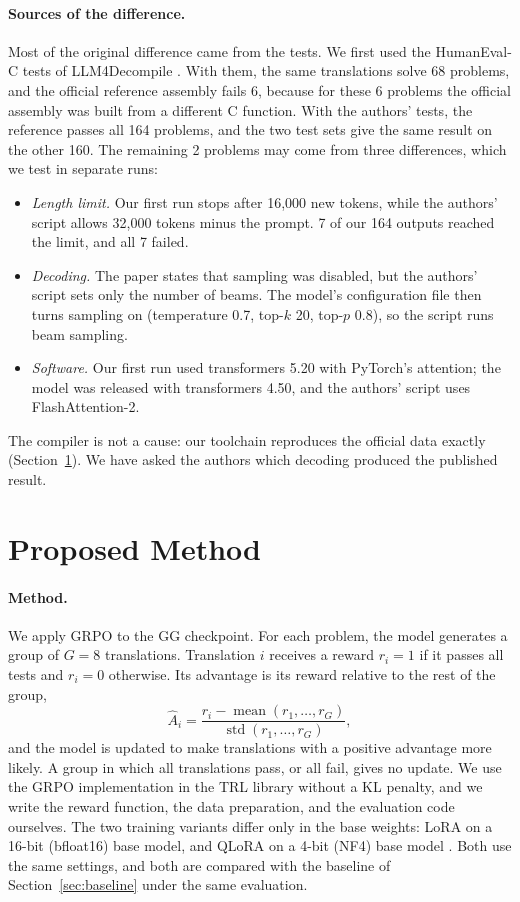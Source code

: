 \documentclass{article}
\begin{document}
\paragraph{Sources of the difference.}
Most of the original difference came from the tests. We first used the HumanEval-C tests of LLM4Decompile \citep{llm4decompile}. With them, the same translations solve 68 problems, and the official reference assembly fails 6, because for these 6 problems the official assembly was built from a different C function. With the authors' tests, the reference passes all 164 problems, and the two test sets give the same result on the other 160. The remaining 2 problems may come from three differences, which we test in separate runs:
\begin{itemize}
  \item \emph{Length limit.} Our first run stops after 16{,}000 new tokens, while the authors' script allows 32{,}000 tokens minus the prompt. 7 of our 164 outputs reached the limit, and all 7 failed.
  \item \emph{Decoding.} The paper states that sampling was disabled, but the authors' script sets only the number of beams. The model's configuration file then turns sampling on (temperature 0.7, top-$k$ 20, top-$p$ 0.8), so the script runs beam sampling.
  \item \emph{Software.} Our first run used transformers 5.20 with PyTorch's attention; the model was released with transformers 4.50, and the authors' script uses FlashAttention-2.
\end{itemize}
The compiler is not a cause: our toolchain reproduces the official data exactly (Section~\ref{sec:method}). We have asked the authors which decoding produced the published result.

\section{Proposed Method}
\label{sec:method}

\paragraph{Method.}
We apply GRPO to the GG checkpoint. For each problem, the model generates a group of $G=8$ translations. Translation $i$ receives a reward $r_i=1$ if it passes all tests and $r_i=0$ otherwise. Its advantage is its reward relative to the rest of the group,
\begin{equation}
\hat{A}_i = \frac{r_i - \operatorname{mean}(r_1,\dots,r_G)}{\operatorname{std}(r_1,\dots,r_G)},
\end{equation}
and the model is updated to make translations with a positive advantage more likely. A group in which all translations pass, or all fail, gives no update. We use the GRPO implementation in the TRL library without a KL penalty, and we write the reward function, the data preparation, and the evaluation code ourselves. The two training variants differ only in the base weights: LoRA on a 16-bit (bfloat16) base model, and QLoRA on a 4-bit (NF4) base model \citep{lora,qlora}. Both use the same settings, and both are compared with the baseline of Section~\ref{sec:baseline} under the same evaluation.
\end{document}
